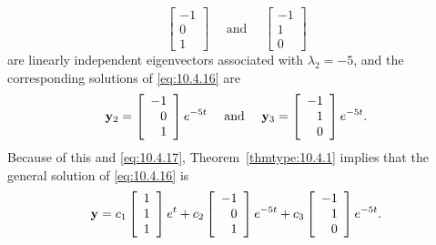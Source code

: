 \begin{examplesolution}
\[
  \left[
  \begin{array}{r}
    -1 \\
    0  \\
    1
  \end{array}\right]\quad \mbox{ and }\quad\left[
  \begin{array}{r}
    -1 \\
    1  \\
    0
  \end{array}\right]
\]
are linearly independent eigenvectors associated with $\lambda_{2}= -5$, and the corresponding
solutions of \eqref{eq:10.4.16} are
\[
  {\bf y}_{2}=\left[
  \begin{array}{r}
    -1 \\
    0  \\
    1
  \end{array}
  \right]e^{-5t}\quad \mbox{ and }\quad{\bf y}_{3}=\left[
  \begin{array}{r}
    -1 \\
    1  \\
    0
  \end{array}\right]e^{-5t}.
\]
Because of this and \eqref{eq:10.4.17}, Theorem~\ref{thmtype:10.4.1} implies that the general
solution of \eqref{eq:10.4.16} is
\[
  {\bf y}=c_{1}\left[
  \begin{array}{r}
    1 \\
    1 \\
    1
  \end{array}\right]e^{t}+c_{2}\left[
  \begin{array}{r}
    -1 \\
    0  \\
    1
  \end{array}\right] e^{-5t}+c_{3}\left[
  \begin{array}{r}
    -1 \\
    1  \\
    0
  \end{array}
  \right]e^{-5t}.
\]
\end{examplesolution}



